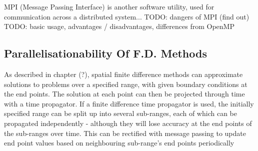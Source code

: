 MPI (Message Passing Interface) is another software utility, used for communication across a distributed system...
TODO: dangers of MPI (find out)
TODO: basic usage, advantages / disadvantages, differences from OpenMP
\subsection{Parallelisationability Of F.D. Methods}
As described in chapter (?), spatial finite difference methods can approximate solutions to problems over a specified range, with given boundary conditions at the end points. The solution at each point can then be projected through time with a time propagator. If a finite difference time propagator is used, the initially specified range can be split up into several sub-ranges, each of which can be propagated independently - although they will lose accuracy at the end points of the sub-ranges over time. This can be rectified with message passing to update end point values based on neighbouring sub-range's end points periodically



